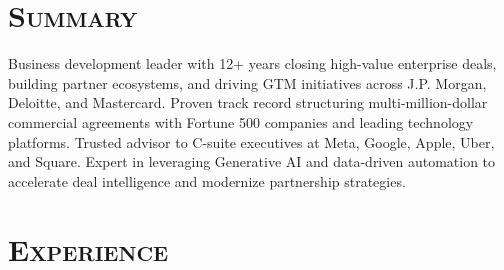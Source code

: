 \documentclass[11pt,a4paper]{moderncv}
\begin{document}
\makecvtitle
\vspace{-40pt}

\section{\textsc{Summary}}
\vspace{-5pt}
Business development leader with 12+ years closing high-value enterprise deals, building partner ecosystems, and driving GTM initiatives across J.P. Morgan, Deloitte, and Mastercard. Proven track record structuring multi-million-dollar commercial agreements with Fortune 500 companies and leading technology platforms. Trusted advisor to C-suite executives at Meta, Google, Apple, Uber, and Square. Expert in leveraging Generative AI and data-driven automation to accelerate deal intelligence and modernize partnership strategies.

\section{\textsc{Experience}}
\end{document}
